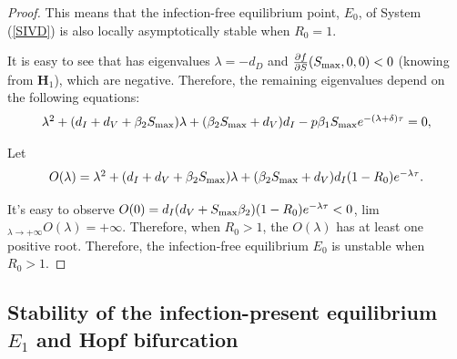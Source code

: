 \documentclass{CMHPhD-SIVD}
\begin{document}
\begin{proof}
This means that the infection-free equilibrium point, $E_0$, of System (\ref{SIVD}) is also locally asymptotically stable when $R_0=1$.

It is easy to see that  has eigenvalues $\lambda=-d_D$ and $\frac{\partial f }{\partial S}(S_{\text{max}}, 0, 0)<0$ (knowing from $\mathbf{H}_1$), which are negative.
Therefore, the remaining eigenvalues depend on the following equations:
\begin{equation}\label{5}
   \begin{array}{ll}
    \lambda^2+(d_I+d_V+\beta_2 S_{\text{max}})\lambda+(\beta_2 S_{\text{max}}+d_V)d_I-p\beta_1 S_{\text{max}} e^{-(\lambda+\delta)\tau}=0,
   \end{array}
\end{equation}

Let
\begin{equation}\label{15}
   \begin{array}{ll}
    O(\lambda)=\lambda^2+(d_I+d_V+\beta_2 S_{\text{max}})\lambda+(\beta_2 S_{\text{max}}+d_V)d_I(1-R_0)e^{-\lambda \tau}.
   \end{array}
\end{equation}

It's easy to observe $O(0)=d_{I}(d_{V}+S_{\text{max}} \beta_2)(1-R_0)e^{-\lambda \tau}<0$, lim$_{\lambda\rightarrow+\infty}O(\lambda)=+\infty$. Therefore, when $R_0>1$, the $O(\lambda)$ has at least one positive root. Therefore, the infection-free equilibrium $E_0$ is unstable when $R_0>1$.


\end{proof}



\subsection{Stability of the infection-present equilibrium $E_1$ and Hopf bifurcation}\label{3.3}
\end{document}
